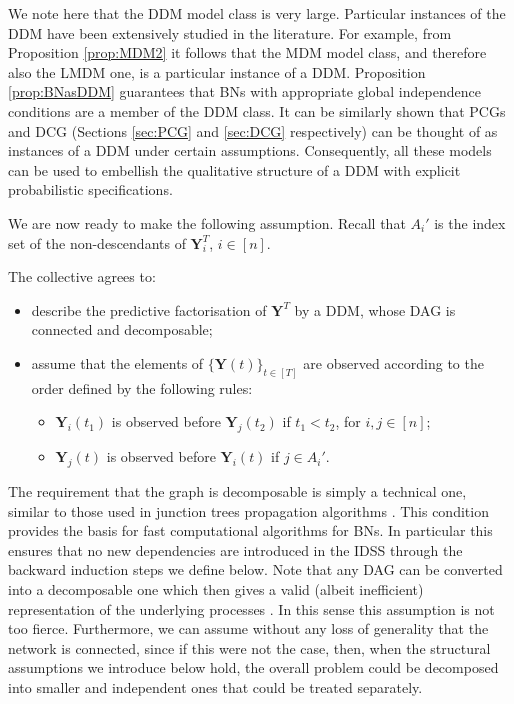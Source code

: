 We note here that  the DDM model class is very large. Particular instances of the DDM have been extensively studied in the literature. For example, from Proposition \ref{prop:MDM2} it follows that the MDM model class, and therefore also the LMDM one, is a particular instance of a DDM. Proposition \ref{prop:BNasDDM} guarantees that BNs with appropriate global independence conditions are a member of the DDM class. It can be similarly shown that PCGs and DCG (Sections \ref{sec:PCG} and \ref{sec:DCG} respectively) can be thought of as instances of a DDM under certain assumptions. Consequently, all these models can be used to embellish the qualitative structure of a DDM with explicit probabilistic specifications. 

We are now ready to make the following assumption. Recall that $A_i'$ is the index set of the non-descendants of $\bm{Y}^T_i$, $i\in[n]$.
\begin{assumption}
The collective agrees to:
\begin{itemize}
\item describe the predictive factorisation of $\bm{Y}^T$ by a DDM, whose  DAG is connected and decomposable;
\item assume that the elements of $\{\bm{Y}(t)\}_{t\in[T]}$ are observed according to the order defined by the following rules:
\begin{itemize}
\item  $\bm{Y}_{i}(t_1)$ is observed before $\bm{Y}_{j}(t_2)$ if $t_1<t_2$, for $i,j\in[n]$;
\item  $\bm{Y}_{j}(t)$ is observed before $\bm{Y}_{i}(t)$ if $j\in A_i'$.
\end{itemize}
\end{itemize}
\label{strutass1}
\end{assumption}

The requirement that the graph is decomposable is simply a technical one, similar to those used in junction trees propagation algorithms \citep[see e.g.][]{Lauritzen1992, Lauritzen1996a,Smith2010}. This condition provides the basis for fast computational algorithms for BNs. In particular this ensures that no new dependencies are introduced in the IDSS through the backward induction steps we define below. Note that any DAG can be converted into a decomposable one which then gives a valid (albeit inefficient) representation of the underlying processes \citep[see e.g.][for an explicit description of this embedding, and Appendix \ref{appendixB}]{Smith2010}. In this sense this assumption is not too fierce. Furthermore, we can assume without any loss of generality that the network is connected, since if this were not the case, then, when the structural assumptions we introduce below hold, the overall problem could be decomposed into smaller and independent ones that could be treated separately.


